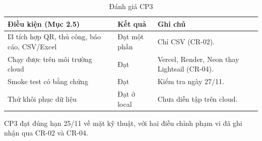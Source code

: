 \begin{table}[H]
\centering\small
\caption{Đánh giá CP3}\label{tab:t3-cp3}
\begin{tabularx}{\linewidth}{@{}p{.32\linewidth}p{.12\linewidth}X@{}}
\toprule
\textbf{Điều kiện (Mục 2.5)} & \textbf{Kết quả} & \textbf{Ghi chú}\\\midrule
I3 tích hợp QR, thủ công, báo cáo, CSV/Excel & Đạt một phần & Chỉ CSV (CR-02).\\
Chạy được trên môi trường cloud & Đạt & Vercel, Render, Neon thay Lightsail (CR-04).\\
Smoke test có bằng chứng & Đạt & Kiểm tra ngày 27/11.\\
Thử khôi phục dữ liệu & Đạt ở local & Chưa diễn tập trên cloud.\\
\bottomrule
\end{tabularx}
\end{table}

CP3 đạt đúng hạn 25/11 về mặt kỹ thuật, với hai điều chỉnh phạm vi đã ghi nhận qua CR-02 và CR-04.
